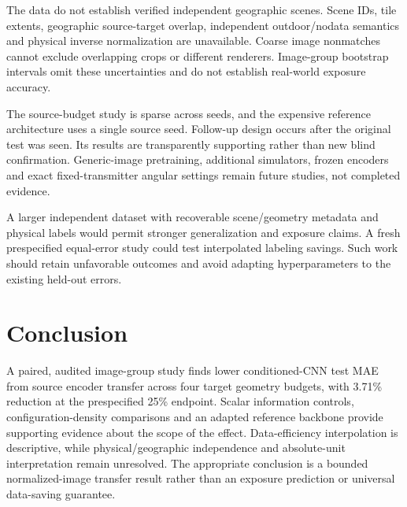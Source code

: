 \documentclass[conference]{IEEEtran}
\begin{document}
The data do not establish verified independent geographic scenes. Scene IDs, tile extents, geographic source-target overlap, independent outdoor/nodata semantics and physical inverse normalization are unavailable. Coarse image nonmatches cannot exclude overlapping crops or different renderers. Image-group bootstrap intervals omit these uncertainties and do not establish real-world exposure accuracy.

The source-budget study is sparse across seeds, and the expensive reference architecture uses a single source seed. Follow-up design occurs after the original test was seen. Its results are transparently supporting rather than new blind confirmation. Generic-image pretraining, additional simulators, frozen encoders and exact fixed-transmitter angular settings remain future studies, not completed evidence.

A larger independent dataset with recoverable scene/geometry metadata and physical labels would permit stronger generalization and exposure claims. A fresh prespecified equal-error study could test interpolated labeling savings. Such work should retain unfavorable outcomes and avoid adapting hyperparameters to the existing held-out errors.

\section{Conclusion}
A paired, audited image-group study finds lower conditioned-CNN test MAE from source encoder transfer across four target geometry budgets, with 3.71\% reduction at the prespecified 25\% endpoint. Scalar information controls, configuration-density comparisons and an adapted reference backbone provide supporting evidence about the scope of the effect. Data-efficiency interpolation is descriptive, while physical/geographic independence and absolute-unit interpretation remain unresolved. The appropriate conclusion is a bounded normalized-image transfer result rather than an exposure prediction or universal data-saving guarantee.
\end{document}
